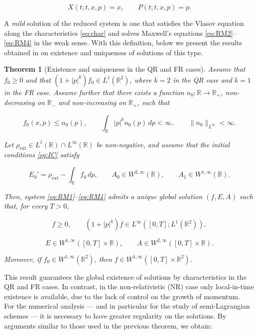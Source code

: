 \documentclass[11pt,a4paper,twoside,pdf]{article}
\numberwithin{equation}{section}
\newtheorem{theorem}{Theorem}[section]
\begin{document}
\[
X(t;t,x,p)=x, \qquad P(t;t,x,p)=p.
\]



A \emph{mild} solution of the reduced system is one that satisfies the Vlasov
equation along the characteristics \eqref{eq:char} and solves Maxwell's
equations \eqref{eq:RM2}--\eqref{eq:RM4} in the weak sense. With this definition, below we present the results obtained in \cite{bostan2007mild} on existence and uniqueness of solutions of this type.



\begin{theorem}[Existence and uniqueness in the QR and FR cases]
Assume that $f_0\ge 0$ and that $(1+|p|^k)f_0\in L^1(\mathbb{R}^2)$, where
$k=2$ in the QR case and $k=1$ in the FR case. Assume further that there exists a function
$n_0:\mathbb{R}\to\mathbb{R}_+$, non-decreasing on $\mathbb{R}_-$ and non-increasing on
$\mathbb{R}_+$, such that


\[
f_0(x,p)\le n_0(p), \qquad
\int_{\mathbb{R}} |p|^k n_0(p)\,dp <\infty, \qquad
\|n_0\|_{L^\infty}<\infty.
\]



Let $\rho_{\mathrm{ext}}\in L^1(\mathbb{R})\cap L^\infty(\mathbb{R})$ be non-negative, and assume
that the initial conditions \eqref{eq:IC} satisfy


\[
E_0' = \rho_{\mathrm{ext}} - \int_{\mathbb{R}} f_0\,dp, \qquad
A_0\in W^{2,\infty}(\mathbb{R}), \qquad
A_1\in W^{1,\infty}(\mathbb{R}).
\]



Then, system \eqref{eq:RM1}--\eqref{eq:RM4} admits a unique global solution
$(f,E,A)$ such that, for every $T>0$,


\[
f\ge 0, \qquad
(1+|p|^k)f \in L^\infty([0,T];L^1(\mathbb{R}^2)),
\]




\[
E\in W^{1,\infty}([0,T]\times\mathbb{R}), \qquad
A\in W^{2,\infty}([0,T]\times\mathbb{R}).
\]


Moreover, if $f_0\in W^{1,\infty}(\mathbb{R}^2)$, then $f\in W^{1,\infty}([0,T]\times\mathbb{R}^2)$.
\end{theorem}

This result guarantees the global existence of solutions by characteristics in the
QR and FR cases. In contrast, in the non-relativistic (NR) case only local-in-time
existence is available, due to the lack of control on the growth of
momentum.\\

For the numerical analysis --- and in particular for the study of
semi-Lagrangian schemes --- it is necessary to have greater regularity on the solutions.
By arguments similar to those used in the previous theorem, we obtain:
\end{document}
